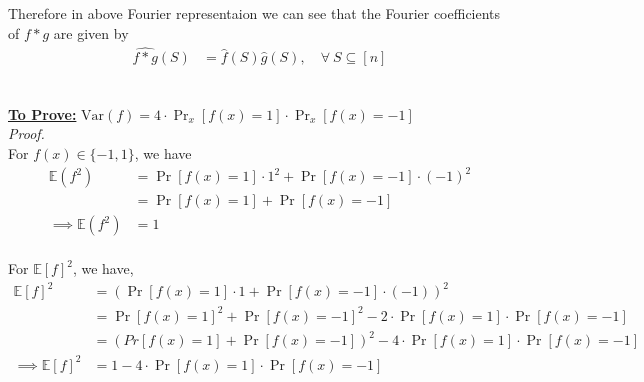 \documentclass{article}
\begin{document}
\noindent
Therefore in above Fourier representaion we can see that the Fourier coefficients of $f * g$ are given by
\begin{align*}
	\widehat{f * g}(S) &= \widehat{f}(S) \widehat{g}(S), \quad \forall\ S \subseteq [n] \\
\end{align*}
\vspace*{-16mm}\begin{flushright}\qedsymbol\end{flushright}


\subsection{}
\pagebreak
\noindent
\underline{\textbf{To Prove:}} $\text{Var}(f) = 4 \cdot \Pr_x[f(x) = 1] \cdot \Pr_x[f(x) = -1]$\\

\noindent
\textit{Proof.} \\
For $f(x) \in \{-1, 1\}$, we have
\begin{align*}
	\mathbb{E}(f^2) &= \Pr[f(x) = 1] \cdot 1^2 + \Pr[f(x) = -1] \cdot (-1)^2 \\
	&= \Pr[f(x) = 1] + \Pr[f(x) = -1] \\
\implies \mathbb{E}(f^2) &= 1 \\
\end{align*}

\noindent
For $\mathbb{E}{[f]}^2$, we have,
\begin{align*}
	\mathbb{E}{[f]}^2 &= \left(\Pr[f(x) = 1] \cdot 1 + \Pr[f(x) = -1] \cdot (-1)\right)^2 \\
	&= \Pr[f(x) = 1]^2 + \Pr[f(x) = -1]^2 - 2 \cdot \Pr[f(x) = 1] \cdot \Pr[f(x) = -1] \\
	& = (Pr[f(x) = 1] + \Pr[f(x) = -1])^2 - 4 \cdot \Pr[f(x) = 1] \cdot \Pr[f(x) = -1] \\
\implies \mathbb{E}{[f]}^2 &= 1 - 4 \cdot \Pr[f(x) = 1] \cdot \Pr[f(x) = -1] \\
\end{align*}
\end{document}
